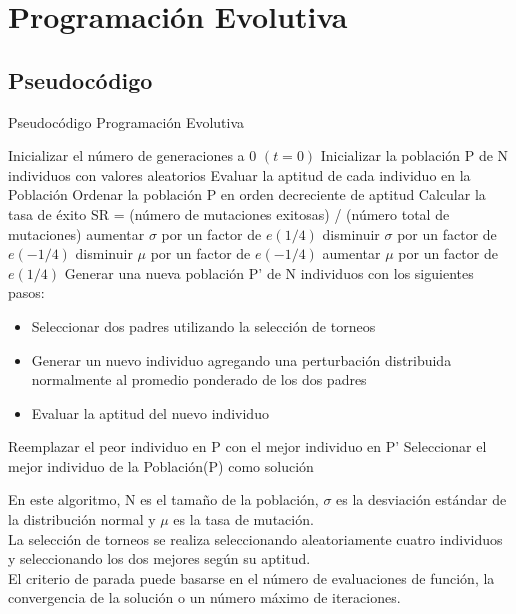 \documentclass{article}
\begin{document}

\newpage
\section{Programación Evolutiva}
\subsection{Pseudocódigo}

\begin{algorithm} \caption{Pseudocódigo Programación Evolutiva}
  \begin{algorithmic}[1]
    \State Inicializar el número de generaciones a 0 $(t=0)$
    \State Inicializar la población P de N individuos con valores aleatorios
    \State Evaluar la aptitud de cada individuo en la Población
    \Repeat
    \State Ordenar la población P en orden decreciente de aptitud
    \State Calcular la tasa de éxito SR = (número de mutaciones exitosas) / (número total de mutaciones)
    \State aumentar $\sigma$ por un factor de $e(1/4)$
    \Else
    \State disminuir $\sigma$ por un factor de $e(-1/4)$
    \EndIf
    \State disminuir $\mu$ por un factor de $e(-1/4)$
    \Else
    \State aumentar $\mu$ por un factor de $e(1/4)$
    \EndIf
    \State Generar una nueva población P' de N individuos con los siguientes pasos:
    \begin{itemize}
    \item Seleccionar dos padres utilizando la selección de torneos
    \item Generar un nuevo individuo agregando una perturbación distribuida normalmente al promedio ponderado de los dos padres
    \item Evaluar la aptitud del nuevo individuo
    \end{itemize}
    \State Reemplazar el peor individuo en P con el mejor individuo en P'
    \State Seleccionar el mejor individuo de la Población(P) como solución
  \end{algorithmic}
\end{algorithm}

En este algoritmo, N es el tamaño de la población, $\sigma$ es la desviación estándar de la distribución normal y $\mu$ es la tasa de mutación. \\La selección de torneos se realiza seleccionando aleatoriamente cuatro individuos y seleccionando los dos mejores según su aptitud. \\El criterio de parada puede basarse en el número de evaluaciones de función, la convergencia de la solución o un número máximo de iteraciones.\\
\end{document}

